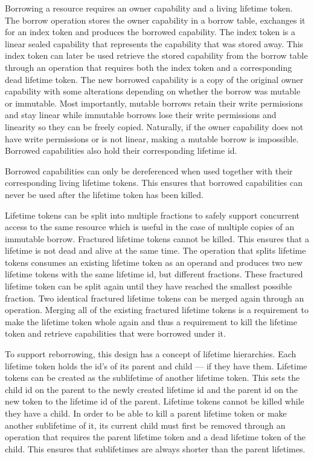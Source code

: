 Borrowing a resource requires an owner capability and a living lifetime token. The borrow operation stores the owner capability in a borrow table, exchanges it for an index token and produces the borrowed capability. The index token is a linear sealed capability that represents the capability that was stored away. This index token can later be used retrieve the stored capability from the borrow table through an operation that requires both the index token and a corresponding dead lifetime token. The new borrowed capability is a copy of the original owner capability with some alterations depending on whether the borrow was mutable or immutable. Most importantly, mutable borrows retain their write permissions and stay linear while immutable borrows lose their write permissions and linearity so they can be freely copied. Naturally, if the owner capability does not have write permissions or is not linear, making a mutable borrow is impossible. Borrowed capabilities also hold their corresponding lifetime id.

Borrowed capabilities can only be dereferenced when used together with their corresponding living lifetime tokens. This ensures that borrowed capabilities can never be used after the lifetime token has been killed.

Lifetime tokens can be split into multiple fractions to safely support concurrent access to the same resource which is useful in the case of multiple copies of an immutable borrow. Fractured lifetime tokens cannot be killed. This ensures that a lifetime is not dead and alive at the same time. The operation that splits lifetime tokens consumes an existing lifetime token as an operand and produces two new lifetime tokens with the same lifetime id, but different fractions. These fractured lifetime token can be split again until they have reached the smallest possible fraction. Two identical fractured lifetime tokens can be merged again through an operation. Merging all of the existing fractured lifetime tokens is a requirement to make the lifetime token whole again and thus a requirement to kill the lifetime token and retrieve capabilities that were borrowed under it.

To support reborrowing, this design has a concept of lifetime hierarchies. Each lifetime token holds the id's of its parent and child --- if they have them. Lifetime tokens can be created as the sublifetime of another lifetime token. This sets the child id on the parent to the newly created lifetime id and the parent id on the new token to the lifetime id of the parent. Lifetime tokens cannot be killed while they have a child. In order to be able to kill a parent lifetime token or make another sublifetime of it, its current child must first be removed through an operation that requires the parent lifetime token and a dead lifetime token of the child. This ensures that sublifetimes are always shorter than the parent lifetimes.

